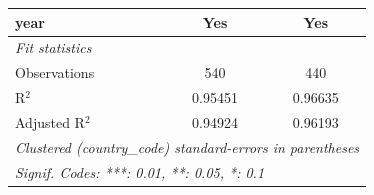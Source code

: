 \begin{tabular}{lcc}
   year           & Yes          & Yes\\  
   \midrule
   \emph{Fit statistics}\\
   Observations   & 540          & 440\\  
   R$^2$          & 0.95451      & 0.96635\\  
   Adjusted R$^2$ & 0.94924      & 0.96193\\  
   \midrule \midrule
   \multicolumn{3}{l}{\emph{Clustered (country\_code) standard-errors in parentheses}}\\
   \multicolumn{3}{l}{\emph{Signif. Codes: ***: 0.01, **: 0.05, *: 0.1}}\\
\end{tabular}
\par\endgroup


